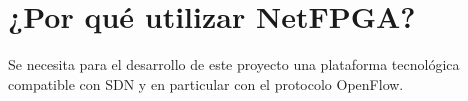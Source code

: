 






\section[¿Por qu\'e utilizar NetFPGA?]{¿Por qu\'e utilizar NetFPGA?}

Se necesita para el desarrollo de este proyecto una plataforma tecnol\'ogica compatible con SDN y en particular con el protocolo OpenFlow.

